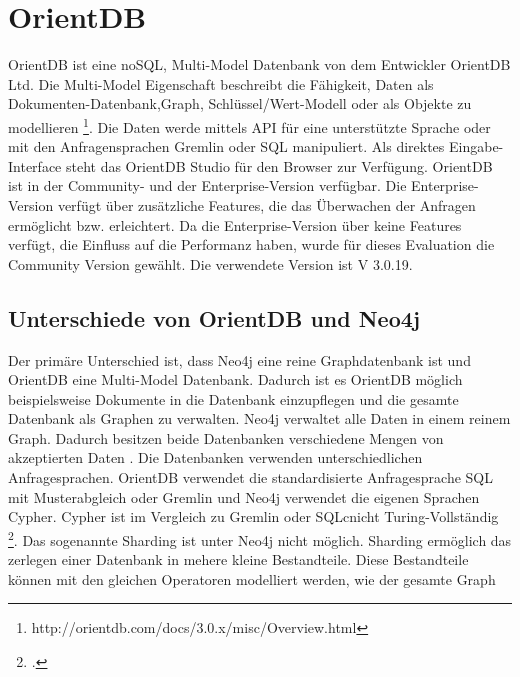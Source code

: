 \section{OrientDB}
OrientDB ist eine noSQL,  Multi-Model Datenbank von dem Entwickler OrientDB Ltd. Die Multi-Model Eigenschaft beschreibt die Fähigkeit, Daten als Dokumenten-Datenbank,Graph, Schlüssel/Wert-Modell oder als Objekte zu modellieren \footnote{http://orientdb.com/docs/3.0.x/misc/Overview.html}. Die Daten werde mittels API für eine unterstützte Sprache oder mit den Anfragensprachen Gremlin oder SQL manipuliert. Als direktes Eingabe-Interface steht das OrientDB Studio für den Browser zur Verfügung. OrientDB ist in der Community- und der Enterprise-Version verfügbar. Die Enterprise-Version verfügt über zusätzliche Features, die das Überwachen der Anfragen ermöglicht bzw. erleichtert. Da die Enterprise-Version über keine Features verfügt, die Einfluss auf die  Performanz haben, wurde für dieses Evaluation die Community Version gewählt. Die verwendete Version ist V 3.0.19. 
\subsection{Unterschiede von OrientDB und Neo4j}
Der primäre Unterschied ist, dass Neo4j eine reine Graphdatenbank ist und OrientDB eine Multi-Model Datenbank. Dadurch ist es OrientDB möglich beispielsweise Dokumente in die Datenbank einzupflegen und die gesamte Datenbank als Graphen zu verwalten. Neo4j verwaltet alle Daten in einem reinem Graph. Dadurch besitzen beide Datenbanken verschiedene Mengen von akzeptierten Daten \parencite{fernandes2018graph}. 
\newline
Die Datenbanken verwenden unterschiedlichen Anfragesprachen. OrientDB verwendet die standardisierte Anfragesprache SQL  mit Musterabgleich oder Gremlin und Neo4j verwendet die eigenen Sprachen Cypher. Cypher ist im Vergleich zu Gremlin oder SQLcnicht Turing-Vollständig \footcite{https://www.quora.com/Should-I-learn-Cypher-or-Gremlin-for-operating-a-Neo4j-database (29.07.19)}. 
\newline
Das sogenannte Sharding ist unter Neo4j nicht möglich. Sharding ermöglich das zerlegen einer Datenbank in mehere kleine Bestandteile. Diese Bestandteile können mit den gleichen Operatoren modelliert werden, wie der gesamte Graph

